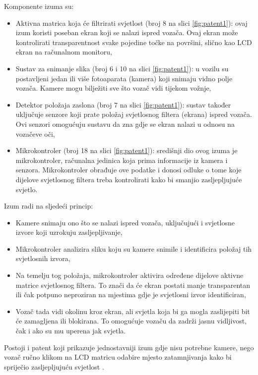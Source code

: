 \documentclass{foi}
\begin{document}
\flushleft Komponente izuma su:
\justifying
\begin{itemize}[noitemsep]
    \item Aktivna matrica koja će filtrirati svjetlost (broj 8 na slici \ref{fig:patent1}): ovaj izum koristi poseban ekran koji se nalazi ispred vozača. Ovaj ekran može kontrolirati transparentnost svake pojedine točke na površini, slično kao LCD ekran na računalnom monitoru,
    \item Sustav za snimanje slika (broj 6 i 10 na slici \ref{fig:patent1}): u vozilu su postavljeni jedan ili više fotoaparata (kamera) koji snimaju vidno polje vozača. Kamere mogu bilježiti sve što vozač vidi tijekom vožnje,
    \item Detektor položaja zaslona (broj 7 na slici \ref{fig:patent1}): sustav također uključuje senzore koji prate položaj svjetlosnog filtera (ekrana) ispred vozača. Ovi senzori omogućuju sustavu da zna gdje se ekran nalazi u odnosu na vozačeve oči,
    \item Mikrokontroler (broj 18 na slici \ref{fig:patent1}): središnji dio ovog izuma je mikrokontroler, računalna jedinica koja prima informacije iz kamera i senzora. Mikrokontroler obrađuje ove podatke i donosi odluke o tome koje dijelove svjetlosnog filtera treba kontrolirati kako bi smanjio zasljepljujuće svjetlo. \cite{Allan2006}
\end{itemize}

\flushleft Izum radi na sljedeći princip:
\justifying
\begin{itemize}[noitemsep]
    \item Kamere snimaju ono što se nalazi ispred vozača, uključujući i svjetlosne izvore koji uzrokuju zasljepljivanje,
    \item Mikrokontroler analizira sliku koju su kamere snimile i identificira položaj tih svjetlosnih izvora,
    \item Na temelju tog položaja, mikrokontroler aktivira određene dijelove aktivne matrice svjetlosnog filtera. To znači da će ekran postati manje transparentan ili čak potpuno neproziran na mjestima gdje je svjetlosni izvor identificiran,
    \item Vozač tada vidi okolinu kroz ekran, ali svjetla koja bi ga mogla zaslijepiti bit će zamagljena ili blokirana. To omogućuje vozaču da zadrži jasnu vidljivost, čak i ako su mu uperena jak svjetla. \cite{Allan2006}
\end{itemize}

Postoji i patent koji prikazuje jednostavniji izum gdje nisu potrebne kamere, nego vozač ručno klikom na LCD matricu odabire mjesto zatamnjivanja kako bi spriječio zasljepljujuću svjetlost \cite{Broude2009}.
\end{document}
